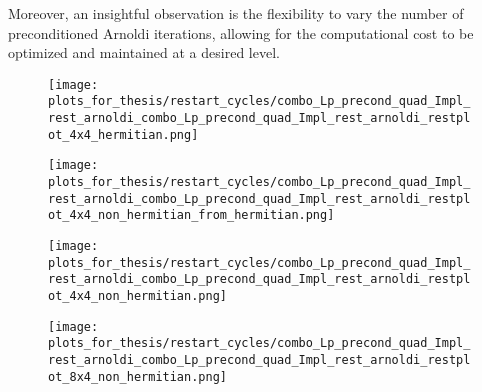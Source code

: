 Moreover, an insightful observation is the flexibility to vary the number of preconditioned Arnoldi iterations, allowing for the computational cost to be optimized and maintained at a desired level.

\begin{figure}[H]
    \centering
    \begin{minipage}{0.45\textwidth}
        \centering
        \texttt{[image: plots\_for\_thesis/restart\_cycles/combo\_Lp\_precond\_quad\_Impl\_rest\_arnoldi\_combo\_Lp\_precond\_quad\_Impl\_rest\_arnoldi\_restplot\_4x4\_hermitian.png]} %
    \end{minipage}%
    \hspace{0.02\textwidth} %
    \begin{minipage}{0.45\textwidth}
        \centering
        \texttt{[image: plots\_for\_thesis/restart\_cycles/combo\_Lp\_precond\_quad\_Impl\_rest\_arnoldi\_combo\_Lp\_precond\_quad\_Impl\_rest\_arnoldi\_restplot\_4x4\_non\_hermitian\_from\_hermitian.png]} %
    \end{minipage}
    
    \vspace{0.02\textwidth} %
    
    \begin{minipage}{0.45\textwidth}
        \centering
        \texttt{[image: plots\_for\_thesis/restart\_cycles/combo\_Lp\_precond\_quad\_Impl\_rest\_arnoldi\_combo\_Lp\_precond\_quad\_Impl\_rest\_arnoldi\_restplot\_4x4\_non\_hermitian.png]} %
    \end{minipage}%
    \hspace{0.02\textwidth} %
    \begin{minipage}{0.45\textwidth}
        \centering
        \texttt{[image: plots\_for\_thesis/restart\_cycles/combo\_Lp\_precond\_quad\_Impl\_rest\_arnoldi\_combo\_Lp\_precond\_quad\_Impl\_rest\_arnoldi\_restplot\_8x4\_non\_hermitian.png]} %
    \end{minipage}


\end{figure}
